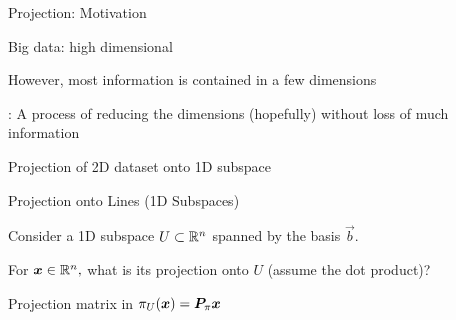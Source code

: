 \documentclass[handout,fleqn,aspectratio=169]{beamer}
\begin{document}
\begin{frame}{Projection: Motivation}

\plitemsep 0.05in

\bci 

\item Big data: high dimensional

\item However, most information is contained in a few dimensions

\item {}: A process of reducing the dimensions (hopefully) without loss of much information

\item \exam Projection of 2D dataset onto 1D subspace

\centering
{}
\eci


\end{frame}

\begin{frame}{Projection onto Lines (1D Subspaces)}

\plitemsep 0.1in

\bci 
\item Consider a 1D subspace $U \subset {\mathbb R}^n$ spanned by the basis $\vec{b}.$ 

\item For $\bm{x} \in {\mathbb R}^{n},$ what is its projection  onto $U$ (assume the dot product)?
{
\small
{}
}
{
\vspace{-0.2cm}
}
\vspace{-0.5cm}
\item Projection matrix   in $\pi_U(\bm{x}) = \bm{P}_\pi \bm{x}$
\eci

\end{frame}
\end{document}
